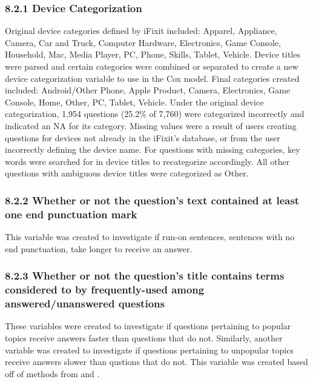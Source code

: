 \documentclass{article}
\begin{document}
\subsubsection*{8.2.1 Device Categorization}

Original device categories defined by iFixit included: Apparel, Appliance, Camera, Car and Truck, Computer Hardware, Electronics, Game Console, Household, Mac, Media Player, PC, Phone, Skills, Tablet, Vehicle. Device titles were parsed and certain categories were combined or separated to create a new device categorization variable to use in the Cox model. Final categories created included: Android/Other Phone, Apple Product, Camera, Electronics, Game Console, Home, Other, PC, Tablet, Vehicle. Under the original device categorization, 1,954 questions (25.2\% of 7,760) were categorized incorrectly and indicated an NA for its category. Missing values were a result of users creating questions for devices not already in the iFixit's database, or from the user incorrectly defining the device name. For questions with missing categories, key words were searched for in device titles to recategorize accordingly. All other questions with ambiguous device titles were categorized as Other. 


\subsubsection*{8.2.2 Whether or not the question's text contained at least one end punctuation mark}

This variable was created to investigate if run-on sentences, sentences with no end punctuation, take longer to receive an answer.


\subsubsection*{8.2.3 Whether or not the question's title contains terms considered to by frequently-used among answered/unanswered questions}

These variables were created to investigate if questions pertaining to popular topics receive answers faster than questions that do not. Similarly, another variable was created to investigate if questions pertaining to unpopular topics receive answers slower than qustions that do not. This variable was created based off of methods from \cite{Correa2013} and \cite{Ravi2014}.
\end{document}
